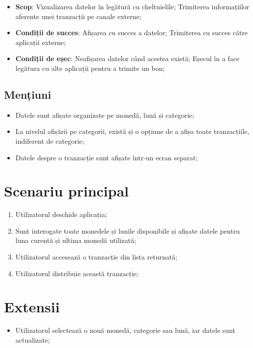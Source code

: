 \begin{itemize}
  \item \textbf{Scop}: Vizualizarea datelor în legătură cu cheltuielile; Trimiterea informațiilor aferente unei tranzacții pe canale externe;
  \item \textbf{Condiții de succes}: Afișarea cu succes a datelor; Trimiterea cu succes către aplicații externe;
  \item \textbf{Condiții de eșec}: Neafișarea datelor când acestea există; Eșecul în a face legătura cu alte aplicații pentru a trimite un bon;
\end{itemize}

\subsection*{Mențiuni}\label{spec:updateWhenFetch}

\begin{itemize}
  \item Datele sunt afișate organizate pe monedă, lună și categorie;
  \item La nivelul afișării pe categorii, există și o opțiune de a afișa toate tranzacțiile, indiferent de categorie;
  \item Datele despre o tranzacție sunt afișate într-un ecran separat;
\end{itemize}

\section*{Scenariu principal}
\begin{enumerate}
  \item Utilizatorul deschide aplicația;
  \item Sunt interogate toate monedele și lunile disponibile și afișate datele pentru luna curentă și ultima monedă utilizată;
  \item Utilizatorul accesează o tranzacție din lista returnată;
  \item Utilizatorul distribuie această tranzacție;
\end{enumerate}

\section*{Extensii}
\begin{itemize}
  \item Utilizatorul selectează o nouă monedă, categorie sau lună, iar datele sunt actualizate;
\end{itemize}
